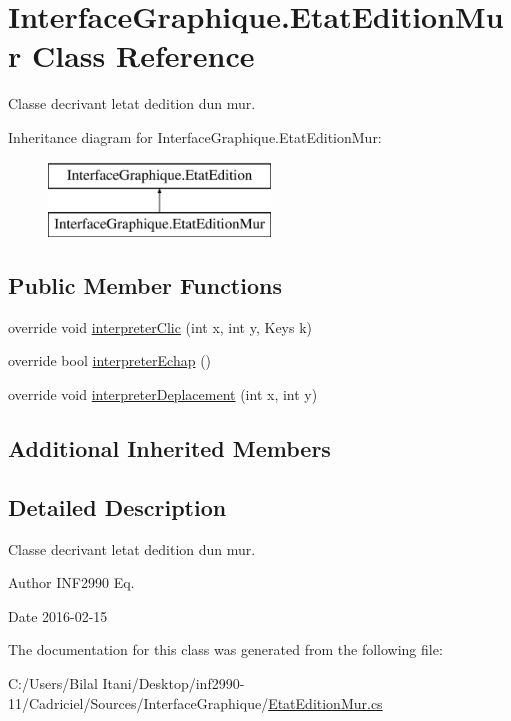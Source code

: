\hypertarget{class_interface_graphique_1_1_etat_edition_mur}{}\section{Interface\+Graphique.\+Etat\+Edition\+Mur Class Reference}
\label{class_interface_graphique_1_1_etat_edition_mur}


Classe decrivant l\textquotesingle{}etat d\textquotesingle{}edition d\textquotesingle{}un mur.  


Inheritance diagram for Interface\+Graphique.\+Etat\+Edition\+Mur\+:\begin{figure}[H]
\begin{center}
\leavevmode
\includegraphics[height=2.000000cm]{class_interface_graphique_1_1_etat_edition_mur}
\end{center}
\end{figure}
\subsection*{Public Member Functions}
\begin{DoxyCompactItemize}
\item 
override void \hyperlink{group__inf2990_gad13a89d6605d4326b0080215502a5fb2}{interpreter\+Clic} (int x, int y, Keys k)
\item 
override bool \hyperlink{group__inf2990_ga8d021b397d9ebd210158236d43df2207}{interpreter\+Echap} ()
\item 
override void \hyperlink{group__inf2990_ga71cbbc58a1d9770318042607ccf474c1}{interpreter\+Deplacement} (int x, int y)
\end{DoxyCompactItemize}
\subsection*{Additional Inherited Members}


\subsection{Detailed Description}
Classe decrivant l\textquotesingle{}etat d\textquotesingle{}edition d\textquotesingle{}un mur. 

\begin{DoxyAuthor}{Author}
I\+N\+F2990 Eq. 
\end{DoxyAuthor}
\begin{DoxyDate}{Date}
2016-\/02-\/15 
\end{DoxyDate}


The documentation for this class was generated from the following file\+:\begin{DoxyCompactItemize}
\item 
C\+:/\+Users/\+Bilal Itani/\+Desktop/inf2990-\/11/\+Cadriciel/\+Sources/\+Interface\+Graphique/\hyperlink{_etat_edition_mur_8cs}{Etat\+Edition\+Mur.\+cs}\end{DoxyCompactItemize}
